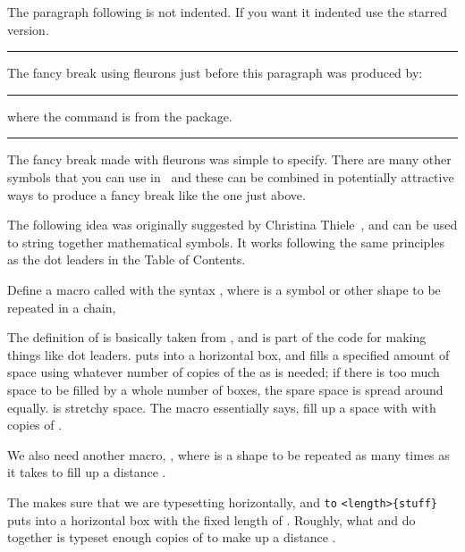   The paragraph following \cmd{\pfbreak} is not indented. If you want
it indented use the \cmd{\pfbreak*} starred version.

\renewcommand{\pfbreakdisplay}{\ding{167}\quad\ding{167}\quad\ding{167}}
\fancybreak{\pfbreakdisplay}

 The fancy break using
fleurons just before this paragraph was produced by:
\begin{lcode}
\renewcommand{\pfbreakdisplay}{%
  \ding{167}\quad\ding{167}\quad\ding{167}}
\fancybreak{\pfbreakdisplay}
\end{lcode}
where the \cmd{\ding} command is from the  package.

\makeatletter
\newcommand{\motif}[1]{\cleaders\hbox{#1}\hfil}
\newcommand{\chain}[2]{\leavevmode\hbox to #2{\motif{#1}}}
\newcommand{\diamondpattern}{\m@th$\mkern-.6mu \diamond \mkern-.6mu$}
\makeatother

\fancybreak{\chain{\diamondpattern}{0.25\textwidth}}

    The fancy break made with fleurons was simple to specify. There are
many other symbols that you can
use in \ltx\ and these can be combined in potentially attractive ways to
produce a fancy break like the one just above.

    The following idea was originally suggested by Christina
Thiele~\cite{ORNAMENTAL}, and can
be used to string together mathematical symbols. It works following the same
principles as the dot leaders in the Table of Contents.

    Define a macro called with the syntax , where
 is a symbol or other shape to be repeated in a chain,
\begin{lcode}
\newcommand{\motif}[1]{\cleaders\hbox{#1}\hfil}
\end{lcode}
The definition of  is basically taken from \tx, and is part of the
code for making things like dot leaders. \cmd{\hbox} puts
 into a horizontal box, and \cmd{\cleaders} fills
a specified amount of space using whatever number of copies of the
 as is needed; if there is
too much space to be filled by a whole number of boxes, the spare space
is spread around equally. \cmd{\hfil} is stretchy space. The  macro
essentially says, fill up a space with with copies of .

    We also need another macro, ,
where 
is a shape to be repeated as many times as it takes to fill up a distance
.
\begin{lcode}
\newcommand{\chain}[2]{\leavevmode\hbox to #2{\motif{#1}}}
\end{lcode}
The \cmd{\leavevmode} makes sure that we are typesetting horizontally, and
\cmd{\hbox} \verb?to? \verb?<length>{stuff}? puts  into a horizontal
box with the
fixed length of . Roughly, what  and 
do together is typeset enough copies of  to make up
a distance .

